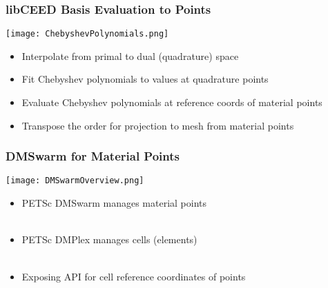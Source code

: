 \documentclass{beamer}
\begin{document}

\begin{frame}
\begin{center}
\frametitle{libCEED Basis Evaluation to Points}

\begin{center}
\texttt{[image: ChebyshevPolynomials.png]}
\end{center}

\begin{itemize}

\item Interpolate from primal to dual (quadrature) space\\

\item Fit Chebyshev polynomials to values at quadrature points\\

\item Evaluate Chebyshev polynomials at reference coords of material points\\

\item Transpose the order for projection to mesh from material points\\

\end{itemize}

\end{center}
\end{frame}


\begin{frame}
\begin{center}
\frametitle{DMSwarm for Material Points}

\begin{center}
\texttt{[image: DMSwarmOverview.png]}
\end{center}

\begin{itemize}

\item PETSc DMSwarm manages material points\\

~\\

\item PETSc DMPlex manages cells (elements)\\

~\\

\item Exposing API for cell reference coordinates of points\\

\end{itemize}

\end{center}
\end{frame}
\end{document}
